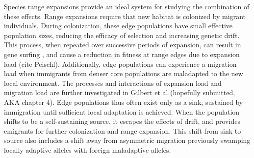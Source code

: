 Species range expansions provide an ideal system for studying the combination of these effects. Range expansions require that new habitat is colonized by migrant individuals. During colonization, these edge populations have small effective population sizes, reducing the efficacy of selection and increasing genetic drift. This process, when repeated over successive periods of expansion, can result in gene surfing \citep{Klopfstein:2006}, and cause a reduction in fitness at range edges due to expansion load (cite Peischl). Additionally, edge populations can experience a migration load when immigrants from denser core populations are maladapted to the new local environment. The processes and interactions of expansion load and migration load are further investigated in Gilbert et al (hopefully submitted, AKA chapter 4). Edge populations thus often exist only as a sink, sustained by immigration until sufficient local adaptation is achieved. %
When the population shifts to be a self-sustaining source, it escapes the effects of drift, and provides emigrants for further colonization and range expansion. This shift from sink to source also includes a shift away from asymmetric migration previously swamping locally adaptive alleles with foreign maladaptive alleles.




